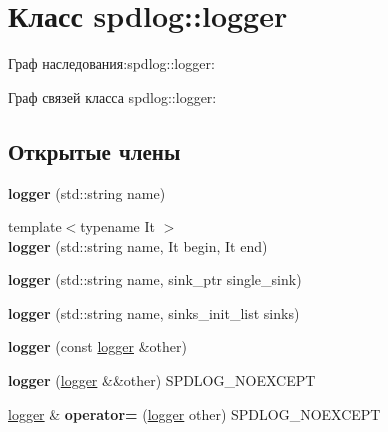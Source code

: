 \hypertarget{classspdlog_1_1logger}{}\section{Класс spdlog\+:\+:logger}
\label{classspdlog_1_1logger}


Граф наследования\+:spdlog\+:\+:logger\+:


Граф связей класса spdlog\+:\+:logger\+:
\subsection*{Открытые члены}
\begin{DoxyCompactItemize}
\item 
\mbox{\label{classspdlog_1_1logger_a441b6358c8df8fdc2367c9977b3c6fc2}} 
{\bfseries logger} (std\+::string name)
\item 
\mbox{\label{classspdlog_1_1logger_a414da79baaad89ba6ffe0e738027d234}} 
{\footnotesize template$<$typename It $>$ }\\{\bfseries logger} (std\+::string name, It begin, It end)
\item 
\mbox{\label{classspdlog_1_1logger_a5d3b321a0319e9b8b27bf04f206a9900}} 
{\bfseries logger} (std\+::string name, sink\+\_\+ptr single\+\_\+sink)
\item 
\mbox{\label{classspdlog_1_1logger_af1f2f69f6bbbe9eb23cf428d66d20f70}} 
{\bfseries logger} (std\+::string name, sinks\+\_\+init\+\_\+list sinks)
\item 
\mbox{\label{classspdlog_1_1logger_a67d32122668fb28ae79ef8bbc37d4762}} 
{\bfseries logger} (const \hyperlink{classspdlog_1_1logger}{logger} \&other)
\item 
\mbox{\label{classspdlog_1_1logger_a6570c456c96f3898fb890336853c110b}} 
{\bfseries logger} (\hyperlink{classspdlog_1_1logger}{logger} \&\&other) S\+P\+D\+L\+O\+G\+\_\+\+N\+O\+E\+X\+C\+E\+PT
\item 
\mbox{\label{classspdlog_1_1logger_ac600636cb690d41f6652ad1c9cc957cf}} 
\hyperlink{classspdlog_1_1logger}{logger} \& {\bfseries operator=} (\hyperlink{classspdlog_1_1logger}{logger} other) S\+P\+D\+L\+O\+G\+\_\+\+N\+O\+E\+X\+C\+E\+PT

\end{DoxyCompactItemize}
